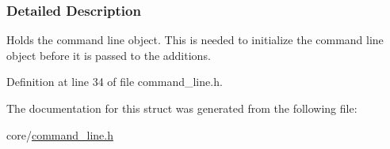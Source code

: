 \subsubsection{Detailed Description}
Holds the command line object. This is needed to initialize the command line object before it is passed to the additions. 

Definition at line 34 of file command\+\_\+line.\+h.



The documentation for this struct was generated from the following file\+:\begin{DoxyCompactItemize}
\item 
core/\hyperlink{command__line_8h}{command\+\_\+line.\+h}\end{DoxyCompactItemize}
